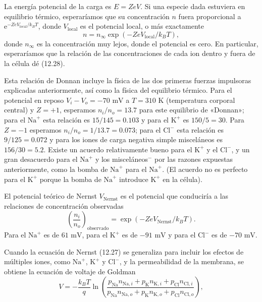 \documentclass[12pt]{book}
\begin{document}
La energía potencial de la carga es $E = ZeV$. Si una especie dada estuviera en equilibrio térmico, esperaríamos que su concentración $n$ fuera proporcional a $\mathrm{e}^{-ZeV_{\mathrm{local}}/k_B T}$, donde $V_{\mathrm{local}}$ es el potencial local, o más exactamente
\begin{equation}
n = n_{\infty} \exp(-ZeV_{\text{local}}/k_B T), \label{eq:12.30}
\end{equation}
donde $n_{\infty}$ es la concentración muy lejos, donde el potencial es cero. En particular, esperaríamos que la relación de las concentraciones de cada ion dentro y fuera de la célula dé (12.28).

Esta relación de Donnan incluye la física de las dos primeras fuerzas impulsoras explicadas anteriormente, así como la física del equilibrio térmico. Para el potencial en reposo $V_i - V_o = -70\text{ mV}$ a $T = 310\text{ K}$ (temperatura corporal central) y $Z = +1$, esperamos $n_i/n_o = 13.7$ para este equilibrio de «Donnan»; para el $\text{Na}^+$ esta relación es $15/145 = 0.103$ y para el $\text{K}^+$ es $150/5 = 30$. Para $Z = -1$ esperamos $n_i/n_o = 1/13.7 = 0.073$; para el $\text{Cl}^-$ esta relación es $9/125 = 0.072$ y para los iones de carga negativa simple misceláneos es $156/30 = 5.2$. Existe un acuerdo relativamente bueno para el $\text{K}^+$ y el $\text{Cl}^-$, y un gran desacuerdo para el $\text{Na}^+$ y los misceláneos$^-$ por las razones expuestas anteriormente, como la bomba de $\text{Na}^+$ para el $\text{Na}^+$. (El acuerdo no es perfecto para el $\text{K}^+$ porque la bomba de $\text{Na}^+$ introduce $\text{K}^+$ en la célula).

El potencial teórico de Nernst $V_{\text{Nernst}}$ es el potencial que conduciría a las relaciones de concentración observadas
\begin{equation}
\left( \frac{n_i}{n_o} \right)_{\text{observado}} = \exp\left( -Ze V_{\text{Nernst}}/k_B T \right). \label{eq:12.31}
\end{equation}
Para el $\text{Na}^+$ es de $61\text{ mV}$, para el $\text{K}^+$ es de $-91\text{ mV}$ y para el $\text{Cl}^-$ es de $-70\text{ mV}$.

Cuando la ecuación de Nernst (12.27) se generaliza para incluir los efectos de múltiples iones, como $\text{Na}^+$, $\text{K}^+$ y $\text{Cl}^-$, y la permeabilidad de la membrana, se obtiene la ecuación de voltaje de Goldman
\begin{equation}
V = -\frac{k_B T}{q} \ln\left( \frac{p_{\text{Na}} n_{\text{Na},i} + p_{\text{K}} n_{\text{K},i} + p_{\text{Cl}} n_{\text{Cl},i}}{p_{\text{Na}} n_{\text{Na},o} + p_{\text{K}} n_{\text{K},o} + p_{\text{Cl}} n_{\text{Cl},o}} \right), \label{eq:12.32}
\end{equation}
\end{document}
